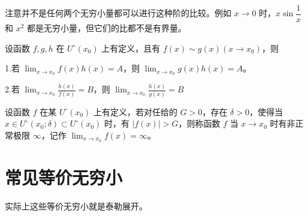 注意并不是任何两个无穷小量都可以进行这种阶的比较。例如 $x\to 0$ 时，$x\sin\dfrac{1}{x}$ 和 $x^2$ 都是无穷小量，但它们的比都不是有界量。

\begin{theorem}
    设函数 $f,g,h$ 在 $U^\circ(x_0)$ 上有定义，且有 $f(x) \sim g(x)(x\to x_0)$，则

    1.若 $\displaystyle\lim_{x\to x_0}f(x)h(x) = A$，则 $\displaystyle\lim_{x\to x_0}g(x)h(x) = A$。

    2.若 $\displaystyle\lim_{x\to x_0}\frac{h(x)}{f(x)}=B$，则 $\displaystyle\lim_{x\to x_0}\frac{h(x)}{g(x)}=B$
\end{theorem}

\begin{definition}[无穷大量]
    设函数 $f$ 在某 $U^\circ(x_0)$ 上有定义，若对任给的 $G>0$，存在 $\delta>0$，使得当 $x\in U^\circ(x_0;\delta)\subset U^\circ(x_0)$ 时，有 $|f(x)|>G$，则称函数 $f$ 当 $x\to x_0$ 时有非正常极限 $\infty$，记作 $\displaystyle\lim_{x\to x_0}f(x) = \infty$。
\end{definition}

\section{常见等价无穷小}

实际上这些等价无穷小就是泰勒展开。


